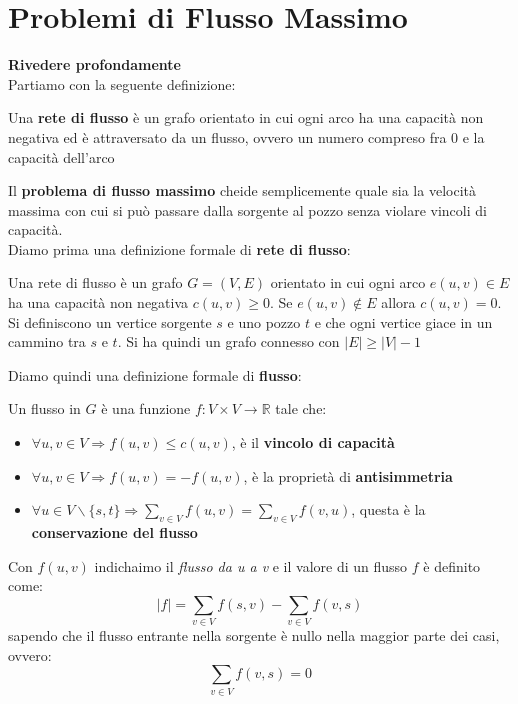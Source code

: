 \documentclass[a4paper,12pt, oneside]{book}
\begin{document}
\chapter{Problemi di Flusso Massimo}
\textbf{Rivedere profondamente}\\
Partiamo con la seguente definizione:
\begin{definizione}
  Una \textbf{rete di flusso} è un grafo orientato in cui ogni arco ha
  una capacità non negativa ed è attraversato da un flusso, ovvero un
  numero compreso fra 0 e la capacità dell'arco
\end{definizione}
Il \textbf{problema di flusso massimo} cheide semplicemente quale sia
la velocità massima con cui si può passare dalla sorgente al pozzo
senza violare vincoli di capacità.\\
Diamo prima una definizione formale di \textbf{rete di flusso}:
\begin{definizione}
  Una rete di flusso è un grafo $G=(V,E)$ orientato in cui ogni arco
  $e(u,v)\in E$ ha una capacità non negativa $c(u,v)\geq 0$. Se
  $e(u,v)\not\in E$ allora $c(u,v)= 0$. Si definiscono un vertice
  sorgente $s$ e uno pozzo $t$ e che ogni vertice giace in un cammino
  tra $s$ e $t$. Si ha quindi un grafo connesso con $|E|\geq |V|-1$
\end{definizione}
Diamo quindi una definizione formale di \textbf{flusso}:
\begin{definizione}
  Un flusso in $G$ è una funzione $f:V\times V\to \mathbb{R}$ tale
  che:
  \begin{itemize}
    \item $\forall u,v\in V \Longrightarrow f(u,v)\leq c(u,v)$, è il
    \textbf{vincolo di capacità}
    \item $\forall u,v\in V \Longrightarrow f(u,v)=- f(u,v)$, è la
    proprietà di \textbf{antisimmetria}
    \item $\forall u\in V\backslash\{s,t\}\Longrightarrow \sum_{v\in V}
    f(u,v)=\sum_{v\in V} f(v,u)$, questa è la \textbf{conservazione
      del flusso} 
  \end{itemize}
  Con $f(u,v)$ indichaimo il \textit{flusso da u a v} e il valore di
  un flusso $f$ è definito come:
  \[|f|=\sum_{v\in V}f(s,v)-\sum_{v\in V}f(v,s)\]
  sapendo che il flusso entrante nella sorgente è nullo nella maggior
  parte dei casi, ovvero:
  \[\sum_{v\in V}f(v,s)=0\]
\end{definizione}
\end{document}

